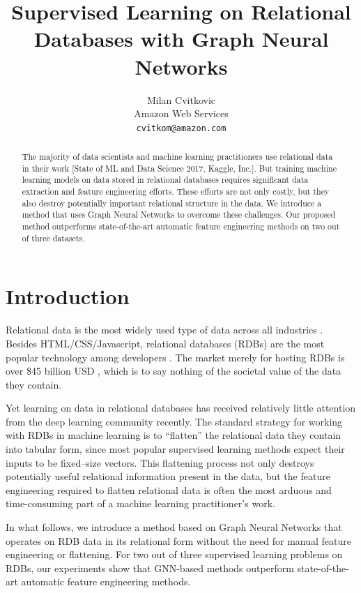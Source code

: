 \documentclass{article}
\title{Supervised Learning on Relational Databases with Graph Neural Networks}
\author{Milan Cvitkovic \\
  Amazon Web Services \\
  \texttt{cvitkom@amazon.com} \\
}
\begin{document}
\maketitle

\begin{abstract}
The majority of data scientists and machine learning practitioners use relational data in their work [State of ML and Data Science 2017, Kaggle, Inc.].  But training machine learning models on data stored in relational databases requires significant data extraction and feature engineering efforts.  These efforts are not only costly, but they also destroy potentially important relational structure in the data.  We introduce a method that uses Graph Neural Networks to overcome these challenges.  Our proposed method outperforms state-of-the-art automatic feature engineering methods on two out of three datasets.
\end{abstract}

\section{Introduction}

Relational data is the most widely used type of data across all industries \citep{kaggle_inc_state_2017}.  Besides HTML/CSS/Javascript, relational databases (RDBs) are the most popular technology among developers \citep{stack_exchange_inc_stack_2018}.  The market merely for hosting RDBs is over \$45 billion USD \citep{asay_nosql_2016}, which is to say nothing of the societal value of the data they contain.

Yet learning on data in relational databases has received relatively little attention from the deep learning community recently. The standard strategy for working with RDBs in machine learning is to ``flatten'' the relational data they contain into tabular form, since most popular supervised learning methods expect their inputs to be fixed--size vectors.  This flattening process not only destroys potentially useful relational information present in the data, but the feature engineering required to flatten relational data is often the most arduous and time-consuming part of a machine learning practitioner's work. 

In what follows, we introduce a method based on Graph Neural Networks that operates on RDB data in its relational form without the need for manual feature engineering or flattening.  For two out of three supervised learning problems on RDBs, our experiments show that GNN-based methods outperform state-of-the-art automatic feature engineering methods.
\end{document}
